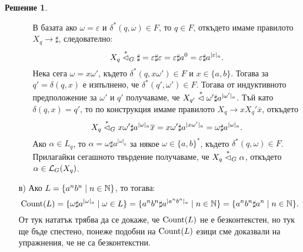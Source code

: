 \documentclass{article}
\theoremstyle{definition}
\newtheorem*{solution}{Решение}
\begin{document}
\begin{solution}
\begin{itemize}
\begin{itemize}
                        В базата ако $\omega = \varepsilon$ и $\delta^*(q, \omega) \in F$, то $q \in F$, откъдето имаме правилото $X_q \rightarrow \sharp$, следователно:
                        \[
                            X_q \stackrel{*}{\vartriangleleft}_G \sharp = \varepsilon \sharp \varepsilon = \varepsilon \sharp a^0 = \varepsilon \sharp a^{|\varepsilon|_a}.
                        \]
                        Нека сега $\omega = x \omega'$, където $\delta^*(q, x \omega') \in F$ и $x \in \{ a, b \}$.
                        Тогава за $q' = \delta(q, x)$ е изпълнено, че $\delta^*(q', \omega') \in F$.
                        Тогава от индуктивното предположение за $\omega'$ и $q'$ получаваме, че $X_{q'} \stackrel{*}{\vartriangleleft} \omega' \sharp a^{|\omega'|_a}$.
                        Тъй като $\delta(q, x) = q'$, то по конструкция имаме правилото $X_q \rightarrow x X_q' \overline{x}$, откъдето
                        \[
                            X_q \stackrel{*}{\vartriangleleft}_G x \omega' \sharp a^{|\omega|_a} \overline{x} = x \omega' \sharp a^{|x \omega'|_a} = \omega \sharp a^{|\omega|_a}.
                        \]
                        Ако $\alpha \in L_q$, то $\alpha = \omega \sharp a^{|\omega|_a}$ за някое $\omega \in \{ a, b \}^*$, където $\delta^*(q, \omega) \in F$.
                        Прилагайки сегашното твърдение получаваме, че $X_q \stackrel{*}{\vartriangleleft}_G \alpha$, откъдето $\alpha \in \mathcal{L}_G(X_q)$.
              \end{itemize}
        \item[в)] Ако $L = \{ a^n b^n \mid n \in \mathbb{N} \}$, то тогава:
              \[
                  \operatorname{Count}(L) = \{ \omega \sharp a^{|\omega|_a} \mid \omega \in L \} = \{ a^n b^n \sharp a^{|a^n b^n|_a} \mid n \in \mathbb{N} \} = \{ a^n b^n \sharp a^n \mid n \in \mathbb{N} \}.
              \]
              От тук нататък трябва да се докаже, че $\operatorname{Count}(L)$ не е безконтекстен, но тук ще бъде спестено, понеже подобни на $\operatorname{Count}(L)$ езици сме доказвали на упражнения, че не са безконтекстни.
    \end{itemize}
\end{solution}
\end{document}
